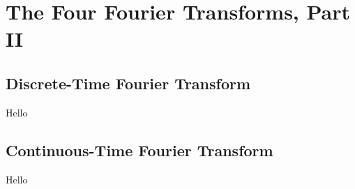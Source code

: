 \chapter{The Four Fourier Transforms, Part II}

\section{Discrete-Time Fourier Transform}
Hello

\section{Continuous-Time Fourier Transform}
Hello
